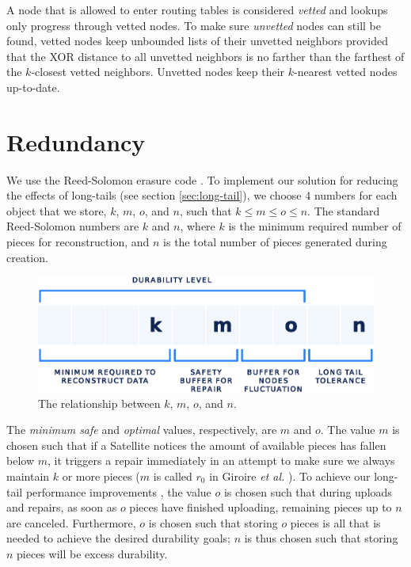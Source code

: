 \documentclass[8pt,fleqn,openany]{book}
\begin{document}
A node that
is allowed to enter routing tables is considered {\em vetted} and lookups
only progress through vetted nodes. To make sure {\em unvetted} nodes can
still be found, vetted nodes keep unbounded lists of their unvetted
neighbors provided that the XOR distance to all unvetted neighbors is no
farther than the farthest of the $k$-closest vetted neighbors. Unvetted
nodes keep their $k$-nearest vetted nodes up-to-date.

\section{Redundancy}\label{sec:concrete-redundancy}

We use the Reed-Solomon erasure code \cite{rs}.
To implement our solution for reducing the effects of long-tails (see section
\ref{sec:long-tail}), we choose 4 numbers for each object that we store, $k$, $m$, $o$, and $n$, such that $k\le m\le o\le n$.
The standard Reed-Solomon numbers are $k$ and $n$, where $k$ is the minimum
required number of pieces for reconstruction, and $n$ is the total number of
pieces generated during creation.

\begin{figure}[!htbp]
\centering
\includegraphics[width=.8\textwidth]{images/kmon.eps}
\caption{The relationship between $k$, $m$, $o$, and $n$.}
\end{figure}

The {\em minimum safe} and {\em optimal} values, respectively, are $m$ and $o$. The
value $m$ is chosen such that if a Satellite notices the amount of available pieces
has fallen below $m$, it triggers a repair
immediately in an attempt to make sure we always maintain
$k$ or more pieces ($m$ is called $r_0$ in Giroire {\em et al.} \cite{p2p-lazy}).
To achieve our long-tail performance improvements
\cite{rs-stragglers, tail-at-scale, mapreduce, rs-intro},
the value $o$ is chosen such that during uploads and repairs,
as soon as $o$ pieces have finished uploading, remaining pieces up to $n$ are
canceled.
Furthermore, $o$ is chosen such that storing $o$ pieces is all that is
needed to achieve the desired durability goals; $n$ is thus chosen such that
storing $n$ pieces will be excess durability.
\end{document}
